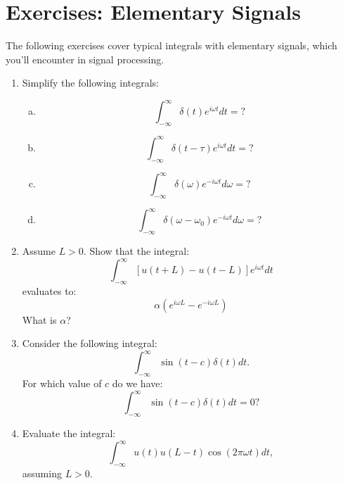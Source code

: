 \newpage
\section{Exercises: Elementary Signals}

The following exercises cover typical integrals with elementary signals, which you'll encounter in signal processing.

\begin{enumerate}
\item Simplify the following integrals:
  \begin{enumerate}[a)]
    \item
  \begin{equation*}
    \int_{-\infty}^{\infty} \delta(t)e^{i\omega t} dt = ?
  \end{equation*}
      \item

  \begin{equation*}
    \int_{-\infty}^{\infty} \delta(t-\tau)e^{i\omega t} dt = ?
    \end{equation*}
      \item
  \begin{equation*}
    \int_{-\infty}^{\infty} \delta(\omega)e^{-i\omega t} d\omega = ?
    \end{equation*}
      \item
  \begin{equation*}
    \int_{-\infty}^{\infty} \delta(\omega-\omega_0)e^{-i\omega t} d\omega = ?
  \end{equation*}
  \end{enumerate}
\item Assume $L>0$. Show that the integral:
\begin{equation*}
    \int_{-\infty}^{\infty} [u(t+L)-u(t-L)]e^{i\omega t}dt
\end{equation*}
evaluates to:
\begin{equation*}
    \alpha (e^{i\omega L} - e^{-i\omega L})
\end{equation*}
What is $\alpha$?

\item Consider the following integral:
\begin{equation*}
    \int_{-\infty}^{\infty}\sin(t-c)\delta(t)dt.
\end{equation*}
For which value of $c$ do we have:
\begin{equation*}
    \int_{-\infty}^{\infty}\sin(t-c)\delta(t)dt=0?
\end{equation*}

\item Evaluate the integral:
\begin{equation*}
    \int_{-\infty}^{\infty}u(t)u(L-t)\cos(2\pi\omega t)dt,
\end{equation*}
assuming $L>0$. 


\end{enumerate}
